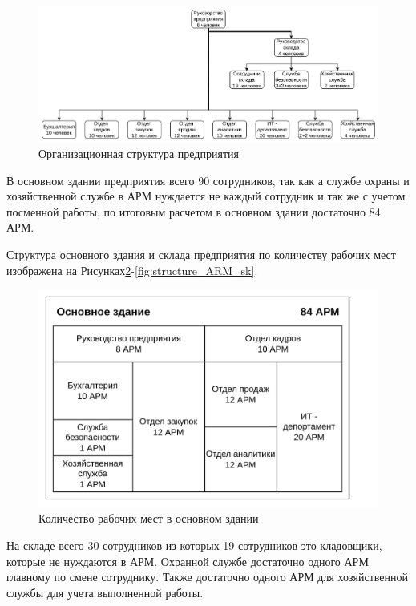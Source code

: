 \begin{figure}[H]
\centering
\includegraphics[scale=0.12]{../misc/org_structure_people.png}
\caption{Организационная структура предприятия\label{fig:stucture_people}}
\end{figure}

В основном здании предприятия всего 90 сотрудников, так как а службе охраны и хозяйственной службе в АРМ нуждается не каждый сотрудник и так же с учетом посменной работы, по итоговым расчетом в основном здании достаточно 84 АРМ.

Структура основного здания и склада предприятия по количеству рабочих мест изображена на Рисунках\;\ref{fig:structure_ARM_oz}-\ref{fig:structure_ARM_sk}.


\begin{figure}[H]
\centering
\includegraphics[scale=0.12]{../misc/org_structure_ARM_oz.png}
\caption{Количество рабочих мест в основном здании\label{fig:structure_ARM_oz}}
\end{figure}

На складе всего 30 сотрудников из которых 19 сотрудников это кладовщики, которые не нуждаются в АРМ. Охранной службе достаточно одного АРМ главному по смене сотруднику. Также достаточно одного АРМ для хозяйственной службы для учета выполненной работы.

